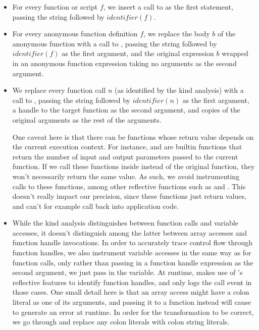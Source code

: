 \begin{itemize}

\item For every function or script $f$, we insert a call to
   as the first statement, passing the string
   followed by $identifier(f)$.

\item For every anonymous function definition $f$, we replace the body $b$ of the
  anonymous function with a call to ,
  passing the string  followed by $identifier(f)$ as the first
  argument, and the original expression $b$ wrapped in an anonymous function
  expression taking no arguments as the second argument.

\item We replace every function call $n$ (as identified by the kind analysis)
  with a call to , passing the string
   followed by $identifier(n)$ as the first argument, a handle to
  the target function as the second argument, and copies of the original
  arguments as the rest of the arguments.

  One caveat here is that there can be functions whose return value
  depends on the current execution context. For instance,  and
   are builtin functions that return the number of input and
  output parameters passed to the current function. If we call these functions
  inside  instead of the original
  function, they won't necessarily return the same value. As such, we avoid
  instrumenting calls to these functions, among other reflective functions such
  as  and . This doesn't really impact our
  precision, since these functions just return values, and can't for example
  call back into application code.


\item While the kind analysis distinguishes between function calls and variable
  accesses, it doesn't distinguish among the latter between array accesses and
  function handle invocations. In order to accurately trace control flow through
  function handles, we also instrument variable accesses in the same way as for
  function calls, only rather than passing in a function handle expression as
  the second argument, we just pass in the variable. At runtime,
   makes use of \matlab's reflective
  features to identify function handles, and only logs the call event in those
  cases. One small detail here is that an array access might have a colon
  literal as one of its arguments, and passing it to a function instead will
  cause \matlab to generate an error at runtime. In order for the
  transformation to be correct, we go through and replace any colon literals
  with colon string literals.

\end{itemize}

